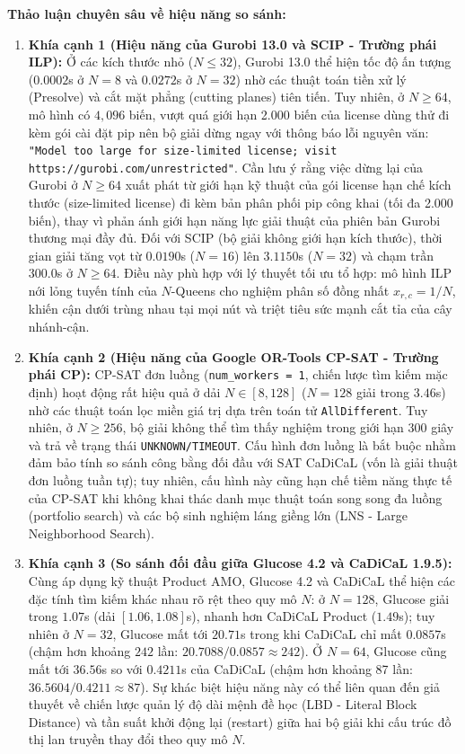 \documentclass[11pt,a4paper]{article}
\begin{document}
\textbf{Thảo luận chuyên sâu về hiệu năng so sánh:}
\begin{enumerate}
    \item \textbf{Khía cạnh 1 (Hiệu năng của Gurobi 13.0 và SCIP - Trường phái ILP):} Ở các kích thước nhỏ ($N \le 32$), Gurobi 13.0 thể hiện tốc độ ấn tượng ($0.0002$s ở $N=8$ và $0.0272$s ở $N=32$) nhờ các thuật toán tiền xử lý (Presolve) và cắt mặt phẳng (cutting planes) tiên tiến. Tuy nhiên, ở $N \ge 64$, mô hình có $4{,}096$ biến, vượt quá giới hạn 2.000 biến của license dùng thử đi kèm gói cài đặt pip nên bộ giải dừng ngay với thông báo lỗi nguyên văn: \texttt{"Model too large for size-limited license; visit https://gurobi.com/unrestricted"}. Cần lưu ý rằng việc dừng lại của Gurobi ở $N \ge 64$ xuất phát từ giới hạn kỹ thuật của gói license hạn chế kích thước (size-limited license) đi kèm bản phân phối pip công khai (tối đa 2.000 biến), thay vì phản ánh giới hạn năng lực giải thuật của phiên bản Gurobi thương mại đầy đủ. Đối với SCIP (bộ giải không giới hạn kích thước), thời gian giải tăng vọt từ $0.0190$s ($N=16$) lên $3.1150$s ($N=32$) và chạm trần $300.0$s ở $N \ge 64$. Điều này phù hợp với lý thuyết tối ưu tổ hợp: mô hình ILP nới lỏng tuyến tính của $N$-Queens cho nghiệm phân số đồng nhất $x_{r,c} = 1/N$, khiến cận dưới trùng nhau tại mọi nút và triệt tiêu sức mạnh cắt tỉa của cây nhánh-cận.
    \item \textbf{Khía cạnh 2 (Hiệu năng của Google OR-Tools CP-SAT - Trường phái CP):} CP-SAT đơn luồng (\texttt{num\_workers = 1}, chiến lược tìm kiếm mặc định) hoạt động rất hiệu quả ở dải $N \in [8, 128]$ ($N=128$ giải trong $3.46$s) nhờ các thuật toán lọc miền giá trị dựa trên toán tử \texttt{AllDifferent}. Tuy nhiên, ở $N \ge 256$, bộ giải không thể tìm thấy nghiệm trong giới hạn 300 giây và trả về trạng thái \texttt{UNKNOWN/TIMEOUT}. Cấu hình đơn luồng là bắt buộc nhằm đảm bảo tính so sánh công bằng đối đầu với SAT CaDiCaL (vốn là giải thuật đơn luồng tuần tự); tuy nhiên, cấu hình này cũng hạn chế tiềm năng thực tế của CP-SAT khi không khai thác danh mục thuật toán song song đa luồng (portfolio search) và các bộ sinh nghiệm láng giềng lớn (LNS - Large Neighborhood Search).
    \item \textbf{Khía cạnh 3 (So sánh đối đầu giữa Glucose 4.2 và CaDiCaL 1.9.5):} Cùng áp dụng kỹ thuật Product AMO, Glucose 4.2 và CaDiCaL thể hiện các đặc tính tìm kiếm khác nhau rõ rệt theo quy mô $N$: ở $N=128$, Glucose giải trong $1.07$s (dải $[1.06, 1.08]$s), nhanh hơn CaDiCaL Product ($1.49$s); tuy nhiên ở $N=32$, Glucose mất tới $20.71$s trong khi CaDiCaL chỉ mất $0.0857$s (chậm hơn khoảng $242$ lần: $20.7088 / 0.0857 \approx 242$). Ở $N=64$, Glucose cũng mất tới $36.56$s so với $0.4211$s của CaDiCaL (chậm hơn khoảng 87 lần: $36.5604 / 0.4211 \approx 87$). Sự khác biệt hiệu năng này có thể liên quan đến giả thuyết về chiến lược quản lý độ dài mệnh đề học (LBD - Literal Block Distance) và tần suất khởi động lại (restart) giữa hai bộ giải khi cấu trúc đồ thị lan truyền thay đổi theo quy mô $N$.

\end{enumerate}
\end{document}
